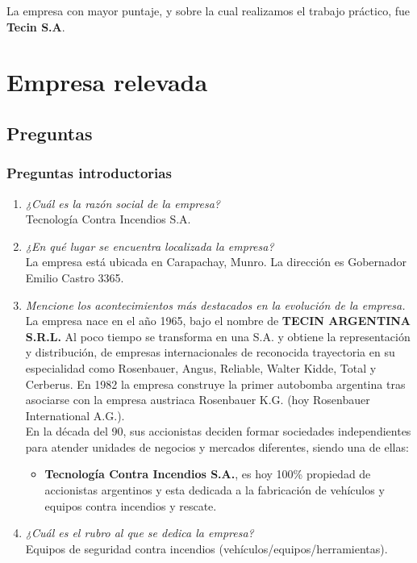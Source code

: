 \documentclass[a4paper,10pt]{article}
\begin{document}
La empresa con mayor puntaje, y sobre la cual realizamos el trabajo práctico, fue \textbf{Tecin S.A}.
\newpage
\section{Empresa relevada}
	
	\subsection{Preguntas}
		\subsubsection{Preguntas introductorias}
			\begin{enumerate}
				\item \textit{¿Cuál es la razón social de la empresa?}\\
				Tecnología Contra Incendios S.A.
				
				\item \textit{¿En qué lugar se encuentra localizada la empresa?}\\
				La empresa está ubicada en Carapachay, Munro. La dirección es Gobernador Emilio Castro 3365.			
				
				\item \textit{Mencione los acontecimientos más destacados en la evolución de la empresa.}\\
				La empresa nace en el año 1965, bajo el nombre de \textbf{TECIN ARGENTINA S.R.L.} Al poco tiempo se transforma en una S.A. y obtiene la representación y distribución, de empresas internacionales de reconocida trayectoria en su especialidad como Rosenbauer, Angus, Reliable, Walter Kidde, Total y Cerberus. En 1982 la empresa construye la primer autobomba argentina tras asociarse con la empresa austriaca Rosenbauer K.G. (hoy Rosenbauer International A.G.).\\
				En la década del 90, sus accionistas deciden formar sociedades independientes para atender unidades de negocios y mercados diferentes, siendo una de ellas: 
				\begin{itemize}
					\item \textbf{Tecnología Contra Incendios S.A.}, es hoy 100\% propiedad de accionistas argentinos y esta dedicada a la fabricación de vehículos y equipos contra incendios y rescate.
				\end{itemize}
				\item \textit{¿Cuál es el rubro al que se dedica la empresa?}\\
				Equipos de seguridad contra incendios (vehículos/equipos/herramientas).
			

\end{enumerate}
\end{document}
